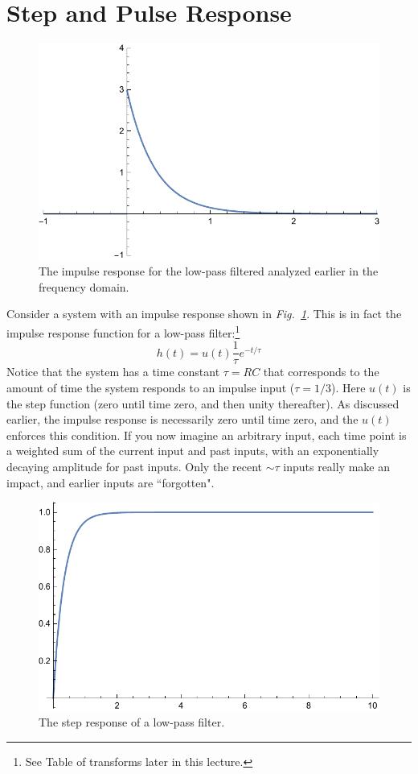 \section{Step and Pulse Response}
\begin{figure}[tb]
\centering
\includegraphics[width=.6\columnwidth]{impulse_resp}
\caption{The impulse response for the low-pass filtered analyzed earlier in the frequency domain. }
\label{fig:impulse_resp}
\end{figure}
Consider a system with an impulse response shown in \emph{Fig.~\ref{fig:impulse_resp}}.  This is in fact the impulse response function for a low-pass filter:\footnote{See Table of transforms later in this lecture.}
    \begin{equation}
        h(t) = u(t) \frac{1}{\tau} e^{-t/\tau}
    \end{equation}
Notice that the system has a time constant $\tau = RC$ that corresponds to the amount of time the system responds to an impulse input ($\tau = 1/3$).  Here $u(t)$ is the step function (zero until time zero, and then unity thereafter).  As discussed earlier, the impulse response is necessarily zero until time zero, and the $u(t)$ enforces this condition.  If you now imagine an arbitrary input, each time point is a weighted sum of the current input and past inputs, with an exponentially decaying amplitude for past inputs.  Only the recent $\sim \tau$ inputs really make an impact, and earlier inputs are ``forgotten".  
\begin{figure}[tb]
\centering
\includegraphics[width=.5\columnwidth]{step_resp}
\caption{The step response of a low-pass filter. }
\label{fig:step_resp}
\end{figure}
